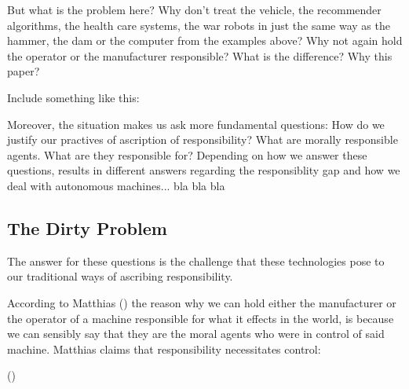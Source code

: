 \documentclass{article}
\newcounter{example}
\begin{document}
But what is the problem here? Why don't treat the vehicle, the recommender
algorithms, the health care systems, the war robots in just the same way as the
hammer, the dam or the computer from the examples above? Why not again hold the
operator or the manufacturer responsible? What is the difference? Why this
paper?


Include something like this:

Moreover, the situation makes us ask more fundamental questions: How do we
justify our practives of ascription of responsibility? What are morally
responsible agents. What are they responsible for? Depending on how we answer
these questions, results in different answers regarding the responsiblity gap
and how we deal with autonomous machines... bla bla bla




%

\subsection{The Dirty Problem}

The answer for these questions is the challenge that these technologies pose to
our traditional ways of ascribing responsibility.

According to Matthias (\cite{Matthias_2004}) the reason why we can hold either the
manufacturer or the operator of a machine responsible for what it effects in the
world, is because we can sensibly say that they are the moral agents who were in
control of said machine. Matthias claims that responsibility necessitates control:

\vspace{.8em}
 (\cite[p.175]{Matthias_2004})
\end{document}
